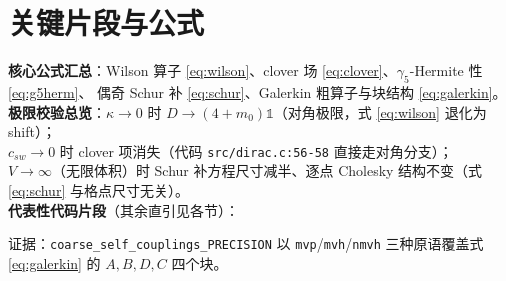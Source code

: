 \documentclass[UTF8]{ctexart}
\begin{document}
\section{关键片段与公式}
\textbf{核心公式汇总}：Wilson 算子 \eqref{eq:wilson}、clover 场 \eqref{eq:clover}、$\gamma_5$-Hermite 性 \eqref{eq:g5herm}、
偶奇 Schur 补 \eqref{eq:schur}、Galerkin 粗算子与块结构 \eqref{eq:galerkin}。
\textbf{极限校验总览}：$\kappa\to0$ 时 $D\to(4+m_0)\mathbb{1}$（对角极限，式 \eqref{eq:wilson} 退化为 shift）；\\
$c_{sw}\to0$ 时 clover 项消失（代码 \texttt{\nolinkurl{src/dirac.c:56-58}} 直接走对角分支）；\\
$V\to\infty$（无限体积）时 Schur 补方程尺寸减半、逐点 Cholesky 结构不变（式 \eqref{eq:schur} 与格点尺寸无关）。\\
\textbf{代表性代码片段}（其余直引见各节）：

\vspace{2mm}\noindent\textcolor{evidence}{证据}：\texttt{coarse\_self\_couplings\_PRECISION} 以
\texttt{mvp}/\texttt{mvh}/\texttt{nmvh} 三种原语覆盖式 \eqref{eq:galerkin} 的 $A,B,D,C$ 四个块。

\end{document}
